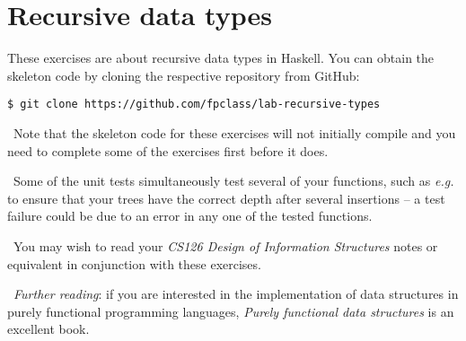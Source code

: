 \section{Recursive data types}

These exercises are about recursive data types in Haskell. You can obtain the skeleton code by cloning the respective repository from GitHub:
\begin{verbatim}
$ git clone https://github.com/fpclass/lab-recursive-types
\end{verbatim}

\makebox[0.5cm]{\faLightbulbO}~Note that the skeleton code for these exercises will not initially compile and you need to complete some of the exercises first before it does. 

\makebox[0.5cm]{\faLightbulbO}~Some of the unit tests simultaneously test several of your functions, such as \emph{e.g.} to ensure that your trees have the correct depth after several insertions -- a test failure could be due to an error in any one of the tested functions.

\makebox[0.5cm]{\faLightbulbO}~You may wish to read your \emph{CS126 Design of Information Structures} notes or equivalent in conjunction with these exercises.

\makebox[0.5cm]{\faBook}~\emph{Further reading}: if you are interested in the implementation of data structures in purely functional programming languages, \emph{Purely functional data structures} \citep{okasaki1999purely} is an excellent book.

\taskLine 

